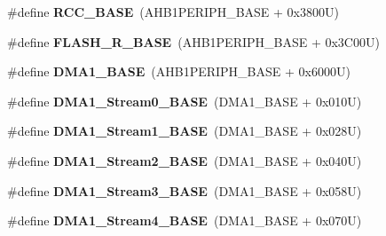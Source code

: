 \begin{DoxyCompactItemize}
\item 
\mbox{\label{group___peripheral__memory__map_ga0e681b03f364532055d88f63fec0d99d}} 
\#define {\bfseries R\+C\+C\+\_\+\+B\+A\+SE}~(A\+H\+B1\+P\+E\+R\+I\+P\+H\+\_\+\+B\+A\+SE + 0x3800\+U)
\item 
\mbox{\label{group___peripheral__memory__map_ga8e21f4845015730c5731763169ec0e9b}} 
\#define {\bfseries F\+L\+A\+S\+H\+\_\+\+R\+\_\+\+B\+A\+SE}~(A\+H\+B1\+P\+E\+R\+I\+P\+H\+\_\+\+B\+A\+SE + 0x3\+C00\+U)
\item 
\mbox{\label{group___peripheral__memory__map_gab2d8a917a0e4ea99a22ac6ebf279bc72}} 
\#define {\bfseries D\+M\+A1\+\_\+\+B\+A\+SE}~(A\+H\+B1\+P\+E\+R\+I\+P\+H\+\_\+\+B\+A\+SE + 0x6000\+U)
\item 
\mbox{\label{group___peripheral__memory__map_ga0d3c52aa35dcc68f78b704dfde57ba95}} 
\#define {\bfseries D\+M\+A1\+\_\+\+Stream0\+\_\+\+B\+A\+SE}~(D\+M\+A1\+\_\+\+B\+A\+SE + 0x010\+U)
\item 
\mbox{\label{group___peripheral__memory__map_ga5b4152cef577e37eccc9311d8bdbf3c2}} 
\#define {\bfseries D\+M\+A1\+\_\+\+Stream1\+\_\+\+B\+A\+SE}~(D\+M\+A1\+\_\+\+B\+A\+SE + 0x028\+U)
\item 
\mbox{\label{group___peripheral__memory__map_ga48a551ee91d3f07dd74347fdb35c703d}} 
\#define {\bfseries D\+M\+A1\+\_\+\+Stream2\+\_\+\+B\+A\+SE}~(D\+M\+A1\+\_\+\+B\+A\+SE + 0x040\+U)
\item 
\mbox{\label{group___peripheral__memory__map_gac51deb54ff7cfe1290dfcf517ae67127}} 
\#define {\bfseries D\+M\+A1\+\_\+\+Stream3\+\_\+\+B\+A\+SE}~(D\+M\+A1\+\_\+\+B\+A\+SE + 0x058\+U)
\item 
\mbox{\label{group___peripheral__memory__map_ga757a3c0d866c0fe68c6176156065a26b}} 
\#define {\bfseries D\+M\+A1\+\_\+\+Stream4\+\_\+\+B\+A\+SE}~(D\+M\+A1\+\_\+\+B\+A\+SE + 0x070\+U)
\item 
\mbox{\label{group___peripheral__memory__map_ga0ded7bed8969fe2e2d616e7f90eb7654}} 

\end{DoxyCompactItemize}
